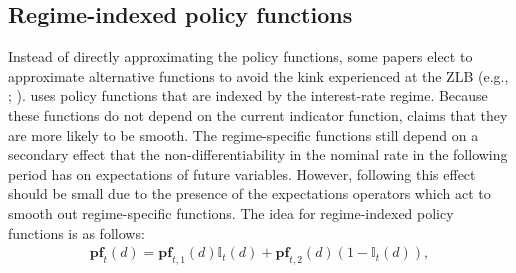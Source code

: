 \documentclass[12pt, final]{article}
\begin{document}
\subsection{Regime-indexed policy functions} Instead of directly approximating the policy functions, some papers elect to approximate alternative functions to avoid the kink experienced at the ZLB (e.g., \hyperlink{Gust}{\color{black}{Gust et al.,\ 2017}}; \hyperlink{Aruoba}{\color{black}{Aruoba et al.,\ 2018}}). \hyperlink{Gust}{\color{black}{Gust et al.\ (2017)}} uses policy functions that are indexed by the interest-rate regime. Because these functions do not depend on the current indicator function,\hyperlink{Gust}{\color{black}{Gust et al.\ (2017)}} claims that they are more likely to be smooth. The regime-specific functions still depend on a secondary effect that the non-differentiability in the nominal rate in the following period has on expectations of future variables.  However, following \hyperlink{Christiano}{\color{black}{Christiano and Fisher (2000)}} this effect should be small due to the presence of the expectations operators which act to smooth out regime-specific functions. The idea for regime-indexed policy functions is as follows:
\begin{gather}
    \label{eq:18}
  \textbf{pf}_t(d) = \textbf{pf}_{t,1}(d)\mathds{I}_t(d) + \textbf{pf}_{t,2}(d)(1-\mathds{I}_t(d)),
\end{gather}
\end{document}
